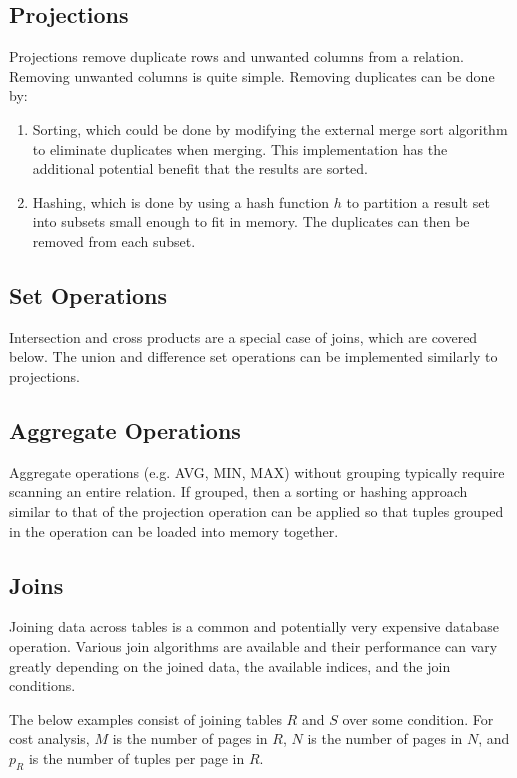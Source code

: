 \documentclass[12pt,titlepage]{article}
\begin{document}
    \subsection{Projections}
      Projections remove duplicate rows and unwanted columns from a relation. Removing unwanted columns is quite simple. Removing duplicates can be done by:

      \begin{enumerate}
        \item Sorting, which could be done by modifying the external merge sort algorithm to eliminate duplicates when merging. This implementation has the
          additional potential benefit that the results are sorted.
        \item Hashing, which is done by using a hash function $h$ to partition a result set into subsets small enough to fit in memory. The duplicates can then
          be removed from each subset.
      \end{enumerate}

    \subsection{Set Operations}
      Intersection and cross products are a special case of joins, which are covered below. The union and difference set operations can be implemented similarly
      to projections.

    \subsection{Aggregate Operations}
      Aggregate operations (e.g. AVG, MIN, MAX) without grouping typically require scanning an entire relation. If grouped, then a sorting or hashing approach
      similar to that of the projection operation can be applied so that tuples grouped in the operation can be loaded into memory together.

    \subsection{Joins}
      Joining data across tables is a common and potentially very expensive database operation. Various join algorithms are available and their performance
      can vary greatly depending on the joined data, the available indices, and the join conditions.

      The below examples consist of joining tables $R$ and $S$ over some condition. For cost analysis, $M$ is the number of pages in $R$, $N$ is the number
      of pages in $N$, and $p_R$ is the number of tuples per page in $R$.
\end{document}
